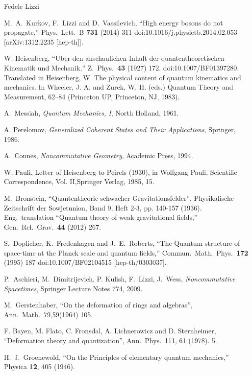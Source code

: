 \begin{artengenv}{Fedele Lizzi}
\begin{thebibliography}{99}

M.~A.~Kurkov, F.~Lizzi and D.~Vassilevich,
  ``High energy bosons do not propagate,''
  Phys.\ Lett.\ B {\bf 731} (2014) 311
  doi:10.1016/j.physletb.2014.02.053
  [arXiv:1312.2235 [hep-th]].

W. Heisenberg,
  ``Uber den anschaulichen Inhalt der quantentheoretischen Kinematik und Mechanik,''
  Z.\ Phys.\  {\bf 43} (1927) 172.
  doi:10.1007/BF01397280. Translated in Heisenberg, W. The physical content of quantum kinematics and mechanics. In Wheeler, J. A. and Zurek, W. H. (eds.) Quantum Theory and Measurement, 62–84 (Princeton UP, Princeton, NJ,
1983). 
 
  A.~Messiah, \textit{Quantum Mechanics, I}, North Holland, 1961.
 
  A. Perelomov, \textit{Generalized Coherent States and
Their Applications},  Springer, 1986.
 
  A.\ Connes, \textit{Noncommutative Geometry}, Academic Press, 1994.

 W. Pauli, Letter of Heisenberg to Peirels (1930), in Wolfgang Pauli, Scientific Correspondence, Vol. II,Springer Verlag, 1985, 15.

M.~Bronstein, ``Quantentheorie schwacher Gravitationsfelder'', Physikalische Zeitschrift der Sowjetunion, Band 9, Heft 2-3, pp. 140-157 (1936). Eng.\  translation ``Quantum theory of weak gravitational fields,''
  Gen.\ Rel.\ Grav.\  {\bf 44} (2012) 267.
  
 S.~Doplicher, K.~Fredenhagen and J.~E.~Roberts,
  ``The Quantum structure of space-time at the Planck scale and quantum fields,''
  Commun.\ Math.\ Phys.\  {\bf 172} (1995) 187
  doi:10.1007/BF02104515
  [hep-th/0303037].
  
 P.~Aschieri, M.~Dimitrijevich, P. Kulish, F.~Lizzi, J.~Wess, \textit{Noncommutative Spacetimes}, Springer Lecture Notes 774, 2009.

 M.\ Gerstenhaber, ``On the deformation of rings and algebras'', Ann.\ Math.\ 79,59(1964) 105.

 F. Bayen, M. Flato, C. Fronsdal, A. Lichnerowicz and D. Sternheimer, ``Deformation theory
and quantization'', Ann.\ Phys.\ 111, 61 (1978). 5.

 H.~J.~Groenewold,
  ``On the Principles of elementary quantum mechanics,''
  Physica {\bf 12}, 405 (1946).


\end{thebibliography}
\end{artengenv}

